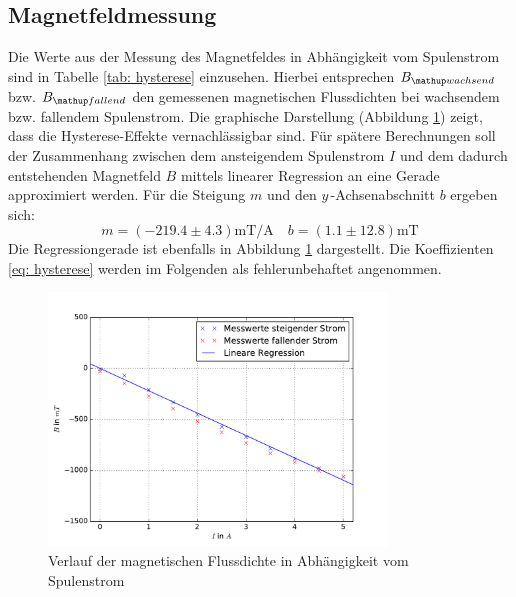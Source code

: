 \subsection{Magnetfeldmessung}
Die Werte aus der Messung des Magnetfeldes in Abhängigkeit vom Spulenstrom sind in Tabelle \ref{tab: hysterese} einzusehen.
Hierbei entsprechen $B\ua{wachsend}$ bzw. $B\ua{fallend}$ den gemessenen magnetischen Flussdichten bei wachsendem
bzw. fallendem Spulenstrom.
Die graphische Darstellung (Abbildung \ref{fig: hysterese}) zeigt, dass die Hysterese-Effekte vernachlässigbar sind. Für
spätere Berechnungen soll der Zusammenhang zwischen dem ansteigendem Spulenstrom $I$ und dem dadurch entstehenden
Magnetfeld $B$ mittels linearer Regression an eine Gerade approximiert werden. Für die Steigung $m$ und den $y\,$-Achsenabschnitt $b$ ergeben sich:
\begin{equation}
  m = (-219.4 \pm 4.3) \si{\milli\tesla \per \ampere} \quad b =  (1.1 \pm 12.8) \si{\milli\tesla}%
  \label{eq: hysterese}
\end{equation}
Die Regressiongerade ist ebenfalls in Abbildung \ref{fig: hysterese} dargestellt. Die Koeffizienten \eqref{eq: hysterese} werden im Folgenden
als fehlerunbehaftet angenommen.
\begin{figure}
  \centering
  \includegraphics[width=0.8\textwidth]{pics/hysterese.pdf}
  \caption{Verlauf der magnetischen Flussdichte in Abhängigkeit vom Spulenstrom}
  \label{fig: hysterese}
\end{figure}




